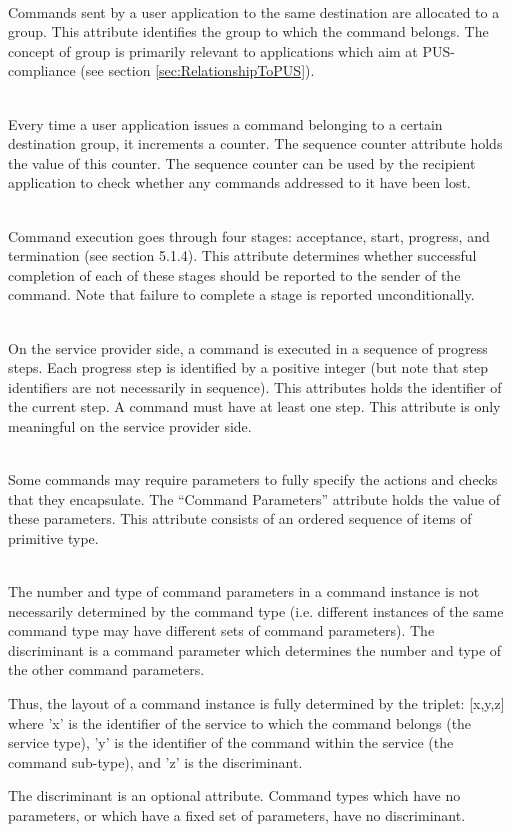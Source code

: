 \begin{fw_description}
\item[Group]\hfill\\
Commands sent by a user application to the same destination are allocated to a group. This attribute identifies the group to which the command belongs. The concept of group is primarily relevant to applications which aim at PUS-compliance (see section \ref{sec:RelationshipToPUS}). 

\item[Sequence Counter]\hfill\\
Every time a user application issues a command belonging to a certain destination group, it increments a counter. The sequence counter attribute holds the value of this counter. The sequence counter can be used by the recipient application to check whether any commands addressed to it have been lost. 

\item[Acknowledge Level]\hfill\\
Command execution goes through four stages: acceptance, start, progress, and termination (see section 5.1.4). This attribute determines whether successful completion of each of these stages should be reported to the sender of the command. Note that failure to complete a stage is reported unconditionally.

\item[Progress Step Identifier]\hfill\\
On the service provider side, a command is executed in a sequence of progress steps. Each progress step is identified by a positive integer (but note that step identifiers are not necessarily in sequence). This attributes holds the identifier of the current step. A command must have at least one step. This attribute is only meaningful on the service provider side.

\item[Command Parameters]\hfill\\
Some commands may require parameters to fully specify the actions and checks that they encapsulate. The “Command Parameters” attribute holds the value of these parameters. This attribute consists of an ordered sequence of items of primitive type. 

\item[Discriminant]\hfill\\
The number and type of command parameters in a command instance is not necessarily determined by the command type (i.e. different instances of the same command type may have different sets of command parameters). The discriminant is a command parameter which determines the number and type of the other command parameters. 

Thus, the layout of a command instance is fully determined by the triplet: [x,y,z] where 'x' is the identifier of the service to which the command belongs (the service type), 'y' is the identifier of the command within the service (the command sub-type), and 'z' is the discriminant. 

The discriminant is an optional attribute. Command types which have no parameters, or which have a fixed set of parameters, have no discriminant.
\end{fw_description}

